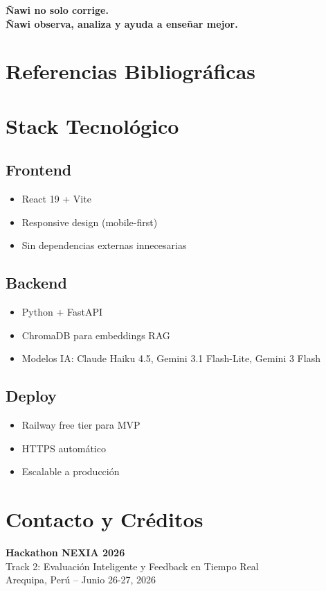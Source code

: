 \documentclass[12pt]{article}
\begin{document}
\begin{center}
\textbf{\Large Ñawi no solo corrige.}\\
\textbf{\Large Ñawi observa, analiza y ayuda a enseñar mejor.}
\end{center}


\newpage
\section*{Referencias Bibliográficas}





\newpage
\appendix

\section{Stack Tecnológico}

\subsection{Frontend}
\begin{itemize}
    \item React 19 + Vite
    \item Responsive design (mobile-first)
    \item Sin dependencias externas innecesarias
\end{itemize}

\subsection{Backend}
\begin{itemize}
    \item Python + FastAPI
    \item ChromaDB para embeddings RAG
    \item Modelos IA: Claude Haiku 4.5, Gemini 3.1 Flash-Lite, Gemini 3 Flash
\end{itemize}

\subsection{Deploy}
\begin{itemize}
    \item Railway free tier para MVP
    \item HTTPS automático
    \item Escalable a producción
\end{itemize}

\section{Contacto y Créditos}

\textbf{Hackathon NEXIA 2026} \\
Track 2: Evaluación Inteligente y Feedback en Tiempo Real \\
Arequipa, Perú -- Junio 26-27, 2026 \\
\end{document}
